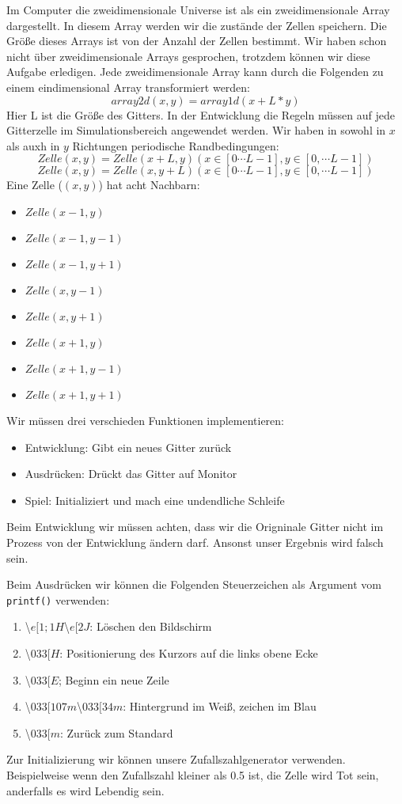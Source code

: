 \documentclass{article}[12pt]
\begin{document}
Im Computer die zweidimensionale Universe ist als ein zweidimensionale Array
dargestellt. In diesem Array werden wir die zustände der Zellen speichern. Die Größe dieses Arrays ist von der Anzahl der Zellen bestimmt. 
Wir haben schon nicht über zweidimensionale Arrays gesprochen, trotzdem können wir diese Aufgabe erledigen. Jede zweidimensionale Array
kann durch die Folgenden zu einem eindimensional Array transformiert werden:
\begin{equation}
array2d(x,y)= array1d(x+L*y)
\end{equation}
Hier L ist die Größe des Gitters. In der Entwicklung die Regeln müssen auf jede Gitterzelle im Simulationsbereich angewendet werden.
Wir haben in sowohl in $x$ als auxh in $y$ Richtungen periodische Randbedingungen:
\begin{equation}
Zelle(x,y)= Zelle(x+L,y) (x\in[0\cdots L-1], y\in[0,\cdots L-1])
\end{equation}
\begin{equation}
Zelle(x,y)= Zelle(x, y+L) (x\in[0\cdots L-1], y\in[0,\cdots L-1])
\end{equation}
Eine Zelle ($(x,y)$) hat acht Nachbarn:
\begin{itemize}
\item  $Zelle(x-1,y)$
\item  $Zelle(x-1,y-1)$
\item  $Zelle(x-1,y+1)$
\item  $Zelle(x,y-1)$
\item  $Zelle(x,y+1)$
\item  $Zelle(x+1,y)$
\item  $Zelle(x+1,y-1)$
\item  $Zelle(x+1,y+1)$
\end{itemize}
Wir müssen drei verschieden Funktionen implementieren:
\begin{itemize}
\item Entwicklung: Gibt ein neues Gitter zurück
\item Ausdrücken: Drückt das Gitter auf Monitor
\item Spiel: Initializiert und mach eine undendliche Schleife
\end{itemize}
Beim Entwicklung wir müssen achten, dass wir die Origninale Gitter nicht im Prozess von der Entwicklung ändern darf. Ansonst unser Ergebnis wird falsch sein.

Beim Ausdrücken wir können die Folgenden Steuerzeichen als Argument vom \texttt{printf()} verwenden:
\begin{enumerate}
\item \textbackslash$e[1;1H$\textbackslash$e[2J$: Löschen den Bildschirm
\item \textbackslash$033[H$: Positionierung des Kurzors auf die links obene Ecke
\item \textbackslash$033[E$; Beginn ein neue Zeile
\item \textbackslash$033[107m$\textbackslash$033[34m$: Hintergrund im Weiß, zeichen im Blau
\item \textbackslash$033[m$: Zurück zum Standard
\end{enumerate}
Zur Initializierung wir können unsere Zufallszahlgenerator verwenden. Beispielweise wenn den
Zufallszahl kleiner als 0.5 ist, die Zelle wird Tot sein, anderfalls es wird Lebendig sein.
\end{document}
